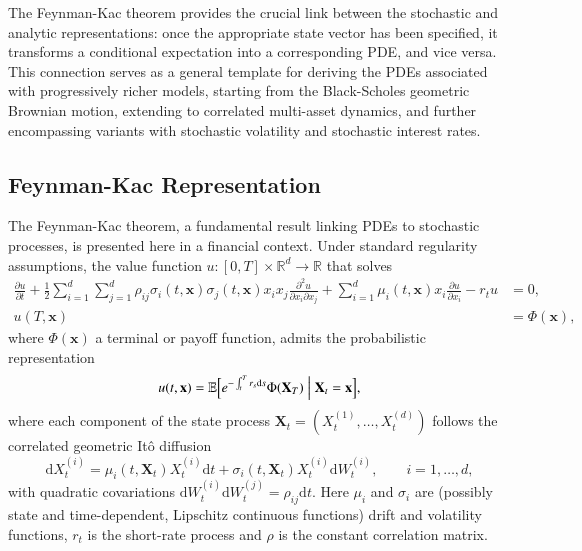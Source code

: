 \documentclass[12pt]{report} %
\theoremstyle{plain} %
\theoremstyle{definition} %
\theoremstyle{remark} %
\begin{document}
The Feynman-Kac theorem provides the crucial link between the stochastic and analytic representations: once 
the appropriate state vector has been specified, it transforms a conditional expectation into a corresponding PDE, 
and vice versa. This connection serves as a general template for deriving the PDEs associated with progressively 
richer models, starting from the Black-Scholes geometric Brownian motion, extending to correlated multi-asset 
dynamics, and further encompassing variants with stochastic volatility and stochastic interest rates.

\subsection{Feynman-Kac Representation}\label{sec:feynman_kac}

The Feynman-Kac theorem, a fundamental result linking PDEs to stochastic processes, is presented here in a financial context.
Under standard regularity assumptions, the value function \(u:[0,T]\times\mathbb R^d\to\mathbb R\) that solves
\begin{equation}\label{eq:fk_pde_multi}
	\begin{aligned}
		\frac{\partial u}{\partial t}
		+ \frac{1}{2}\sum_{i=1}^{d}\sum_{j=1}^{d}
		 \rho_{ij}\sigma_i(t,\mathbf x)\sigma_j(t,\mathbf x)x_i x_j
		 \frac{\partial^{2}u}{\partial x_i\partial x_j}
		+ \sum_{i=1}^{d}\mu_i(t,\mathbf x)x_i\frac{\partial u}{\partial x_i}
		- r_t u &= 0,\\
		u(T,\mathbf x)&=\Phi(\mathbf x),
	\end{aligned}
\end{equation}
where $\Phi(\mathbf x)$ a terminal or payoff function, admits the probabilistic representation
\begin{equation}\label{eq:feynman_kac}
	u(t,\mathbf x)=
	\mathbb E\Bigl[
		e^{-\int_t^{T} r_s \mathrm ds}
		\Phi(\mathbf X_T)
		\Bigm| \mathbf X_t=\mathbf x
	\Bigr],
\end{equation}
where each component of the state process \(\mathbf X_t=(X_t^{(1)},\ldots,X_t^{(d)})\) follows the correlated geometric It\^o diffusion
\begin{equation}\label{eq:general_sde}
	\mathrm dX_t^{(i)}
		=\mu_i(t,\mathbf X_t)X_t^{(i)} \mathrm dt
		+ \sigma_i(t,\mathbf X_t)X_t^{(i)} \mathrm dW_t^{(i)},
	\qquad i=1,\ldots,d,
\end{equation}
with quadratic covariations \(\mathrm dW_t^{(i)}\mathrm dW_t^{(j)}=\rho_{ij} \mathrm dt\).
Here \(\mu_i\) and \(\sigma_i\) are (possibly state and time-dependent, Lipschitz continuous functions) drift and volatility functions, \(r_t\) is the short-rate
process and \(\rho\) is the constant correlation matrix.
\end{document}
